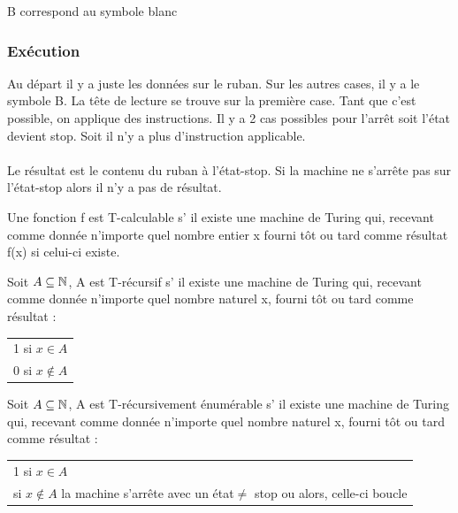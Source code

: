 \begin{mydef}
		B correspond au symbole blanc
\end{mydef}

\subsubsection{Exécution}
Au départ il y a juste les données sur le ruban. Sur les autres cases, il y a le 
symbole B. La tête de lecture se trouve sur la première case. Tant que c'est 
possible, on applique des instructions. Il y a 2 cas possibles pour l'arrêt soit 
l'état devient stop. Soit il n'y a plus d'instruction applicable.

\paragraph{} Le résultat est le contenu du ruban à l'état-stop. Si la machine 
ne s'arrête pas sur l'état-stop alors il n'y a pas de résultat.

\begin{mydef}[T-calculable] Une fonction f est T-calculable s’ il existe une machine de Turing qui, 
	recevant comme donnée n'importe quel nombre entier x fourni tôt ou tard 
	comme résultat f(x) si celui-ci existe.
\end{mydef}

\begin{mydef}[T-récursif] Soit $A\subseteq \mathbb{N}$, A est T-récursif s’ il existe 
	une machine de Turing qui, recevant comme donnée n'importe quel nombre 
	naturel x, fourni tôt ou tard comme résultat : 
	\begin{tabular}{l}
		1 si $x\in A$ \\
		0 si $x\notin A$ \\
	\end{tabular}
\end{mydef}

\begin{mydef} Soit $A\subseteq \mathbb{N}$, A est 
	T-récursivement énumérable s’ il existe 
	une machine de Turing qui, recevant comme donnée n'importe quel nombre 
	naturel x, fourni tôt ou tard comme résultat : \\
	\begin{tabular}{l}
		1 si $x\in A$ \\
		si $x\notin A$ la machine s'arrête avec un état$\neq$ stop ou 
		alors, celle-ci boucle\\
	\end{tabular}
\end{mydef}

